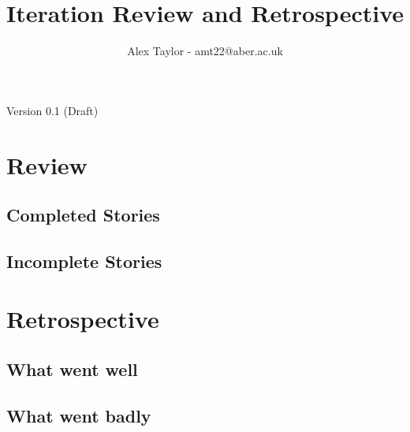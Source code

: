 \documentclass{article}
\title{Iteration Review and Retrospective}
\author{Alex Taylor - amt22@aber.ac.uk}
\begin{document}
\maketitle
\begin{center}
	Version 0.1 (Draft)
\end{center}
\thispagestyle{empty}
\newpage

\section{Review}
\subsection{Completed Stories}
\subsection{Incomplete Stories}
\newpage

\section{Retrospective}
\subsection{What went well}

\subsection{What went badly}
\end{document}
